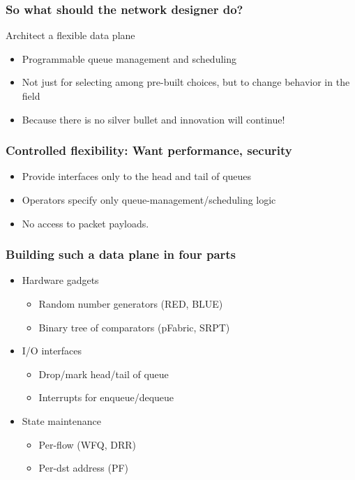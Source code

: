 \begin{Large}
\begin{frame}[plain]
\frametitle{So what should the network designer do?}
Architect a flexible data plane
\begin{itemize}
\item Programmable queue management and scheduling
\item Not just for selecting among pre-built choices, but to change
  behavior in the field
\item Because there is no silver bullet and innovation will continue!
\end{itemize}
\end{frame}

\begin{frame}[plain]
\frametitle{Controlled flexibility: Want performance, security}


\begin{itemize}
\item Provide interfaces only to the head and tail of queues
\item Operators specify only queue-management/scheduling logic
\item No access to packet payloads.
\end{itemize}
\end{frame}

\begin{frame}[plain]
\frametitle{Building such a data plane in four parts}
\begin{itemize}
\item Hardware gadgets
      \begin{itemize}
      \item Random number generators (RED, BLUE)
      \item Binary tree of comparators (pFabric, SRPT)
      \end{itemize}

\item I/O interfaces
      \begin{itemize}
      \item Drop/mark head/tail of queue
      \item Interrupts for enqueue/dequeue
      \end{itemize}

\item State maintenance
      \begin{itemize}
      \item Per-flow (WFQ, DRR)
      \item Per-dst address (PF)
      \end{itemize}


\end{itemize}
\end{frame}
\end{Large}
